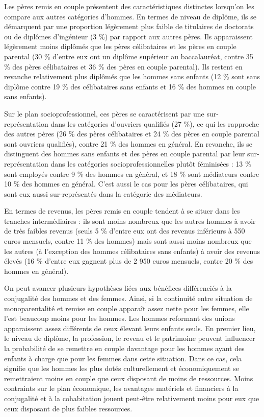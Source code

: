 \documentclass[
  12pt,
]{book}
\begin{document}
Les pères remis en couple présentent des caractéristiques distinctes
lorsqu'on les compare aux autres catégories d'hommes. En termes de
niveau de diplôme, ils se démarquent par une proportion légèrement plus
faible de titulaires de doctorats ou de diplômes d'ingénieur (3 \%) par
rapport aux autres pères. Ils apparaissent légèrement moins diplômés que
les pères célibataires et les pères en couple parental (30 \% d'entre
eux ont un diplôme supérieur au baccalauréat, contre 35 \% des pères
célibataires et 36 \% des pères en couple parental). Ils restent en
revanche relativement plus diplômés que les hommes sans enfants (12 \%
sont sans diplôme contre 19 \% des célibataires sans enfants et 16 \%
des hommes en couple sans enfants).

Sur le plan socioprofessionnel, ces pères se caractérisent par une
sur-représentation dans les catégories d'ouvriers qualifiés (27 \%), ce
qui les rapproche des autres pères (26 \% des pères célibataires et 24
\% des pères en couple parental sont ouvriers qualifiés), contre 21 \%
des hommes en général. En revanche, ils se distinguent des hommes sans
enfants et des pères en couple parental par leur sur-représentation dans
les catégories socioprofessionnelles plutôt féminisées : 13 \% sont
employés contre 9 \% des hommes en général, et 18 \% sont médiateurs
contre 10 \% des hommes en général. C'est aussi le cas pour les pères
célibataires, qui sont eux aussi sur-représentés dans la catégorie des
médiateurs.

En termes de revenus, les pères remis en couple tendent à se situer dans
les tranches intermédiaires : ils sont moins nombreux que les autres
hommes à avoir de très faibles revenus (seuls 5 \% d'entre eux ont des
revenus inférieurs à 550 euros mensuels, contre 11 \% des hommes) mais
sont aussi moins nombreux que les autres (à l'exception des hommes
célibataires sans enfants) à avoir des revenus élevés (16 \% d'entre eux
gagnent plus de 2 950 euros mensuels, contre 20 \% des hommes en
général).

On peut avancer plusieurs hypothèses liées aux bénéfices différenciés à
la conjugalité des hommes et des femmes. Ainsi, si la continuité entre
situation de monoparentalité et remise en couple apparaît assez nette
pour les femmes, elle l'est beaucoup moins pour les hommes. Les hommes
reformant des unions apparaissent assez différents de ceux élevant leurs
enfants seuls. En premier lieu, le niveau de diplôme, la profession, le
revenu et le patrimoine peuvent influencer la probabilité de se remettre
en couple davantage pour les hommes ayant des enfants à charge que pour
les femmes dans cette situation. Dans ce cas, cela signifie que les
hommes les plus dotés culturellement et économiquement se remettraient
moins en couple que ceux disposant de moins de ressources. Moins
contraints sur le plan économique, les avantages matériels et financiers
à la conjugalité et à la cohabitation jouent peut-être relativement
moins pour eux que ceux disposant de plus faibles ressources.
\end{document}
